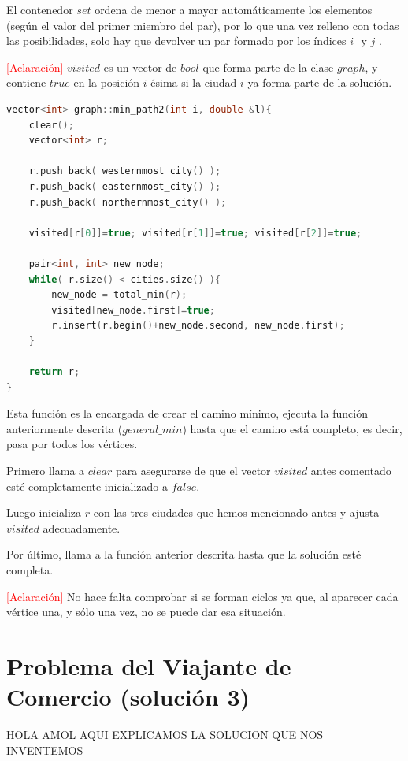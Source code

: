 \documentclass[11pt]{article}
\begin{document}
El contenedor $set$ ordena de menor a mayor automáticamente los elementos (según el valor del primer miembro del par), por lo que una vez relleno con todas las posibilidades, solo hay que devolver un par formado por los índices $i\_$ y $j\_$.

\textcolor{red}{[Aclaración]} $visited$ es un vector de $bool$ que forma parte de la clase $graph$, y contiene $true$ en la posición $i$-ésima si la ciudad $i$ ya forma parte de la solución.

\begin{lstlisting}[language=C++, caption=min\_path2]
vector<int> graph::min_path2(int i, double &l){
	clear();
	vector<int> r;
	
	r.push_back( westernmost_city() );
	r.push_back( easternmost_city() );
	r.push_back( northernmost_city() );
	
	visited[r[0]]=true; visited[r[1]]=true; visited[r[2]]=true;
	
	pair<int, int> new_node;
	while( r.size() < cities.size() ){
		new_node = total_min(r);
		visited[new_node.first]=true;
		r.insert(r.begin()+new_node.second, new_node.first);    
	}
	
	return r;      
}
\end{lstlisting}

Esta función es la encargada de crear el camino mínimo, ejecuta la función anteriormente descrita ($general\_min$) hasta que el camino está completo, es decir, pasa por todos los vértices.

Primero llama a $clear$ para asegurarse de que el vector $visited$ antes comentado esté completamente inicializado a $false$.

Luego inicializa $r$ con las tres ciudades que hemos mencionado antes y ajusta $visited$ adecuadamente.

Por último, llama a la función anterior descrita hasta que la solución esté completa.

\textcolor{red}{[Aclaración]} No hace falta comprobar si se forman ciclos ya que, al aparecer cada vértice una, y sólo una vez, no se puede dar esa situación.

\section{Problema del Viajante de Comercio (solución 3)}
HOLA AMOL AQUI EXPLICAMOS LA SOLUCION QUE NOS INVENTEMOS
\end{document}
